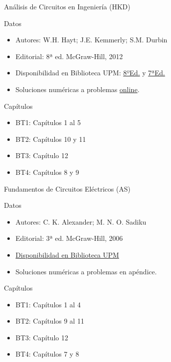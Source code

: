 \documentclass[aspectratio=169, usenames,svgnames,dvipsnames]{beamer}
\begin{document}
\begin{frame}[label={sec:org73f4552}]{Análisis de Circuitos en Ingeniería (\alert{HKD})}
\begin{block}{Datos}
\begin{itemize}
\item Autores: W.H. Hayt; J.E. Kemmerly; S.M. Durbin
\item Editorial: 8ª ed. McGraw-Hill, 2012
\item Disponibilidad en Biblioteca UPM: \href{https://ingenio.upm.es/primo-explore/fulldisplay?docid=34UPM\_ALMA2167505120004212\&context=L\&vid=34UPM\_VU1\&search\_scope=TAB1\_SCOPE1\&isFrbr=true\&tab=tab1\&lang=es\_ES}{8ºEd.} y \href{https://ingenio.upm.es/primo-explore/fulldisplay?docid=34UPM\_ALMA2154460960004212\&context=L\&vid=34UPM\_VU1\&search\_scope=TAB1\_SCOPE1\&isFrbr=true\&tab=tab1\&lang=es\_ES}{7ªEd.}
\item Soluciones numéricas a problemas \href{http://highered.mheducation.com/sites/0073529575/student\_view0/answers\_to\_selected\_problems.html}{online}.
\end{itemize}
\end{block}

\begin{block}{Capítulos}
\begin{itemize}
\item BT1: Capítulos 1 al 5
\item BT2: Capítulos 10 y 11
\item BT3: Capítulo 12
\item BT4: Capítulos 8 y 9
\end{itemize}
\end{block}
\end{frame}

\begin{frame}[label={sec:orgd897b99}]{Fundamentos de Circuitos Eléctricos (\alert{AS})}
\begin{block}{Datos}
\begin{itemize}
\item Autores: C. K. Alexander; M. N. O. Sadiku
\item Editorial: 3ª ed. McGraw-Hill, 2006
\item \href{https://ingenio.upm.es/primo-explore/fulldisplay?docid=34UPM\_ALMA2164599810004212\&context=L\&vid=34UPM\_VU1\&search\_scope=TAB1\_SCOPE1\&isFrbr=true\&tab=tab1\&lang=es\_ES}{Disponibilidad en Biblioteca UPM}
\item Soluciones numéricas a problemas en apéndice.
\end{itemize}
\end{block}

\begin{block}{Capítulos}
\begin{itemize}
\item BT1: Capítulos 1 al 4
\item BT2: Capítulos 9 al 11
\item BT3: Capítulo 12
\item BT4: Capítulos 7 y 8
\end{itemize}
\end{block}
\end{frame}
\end{document}

